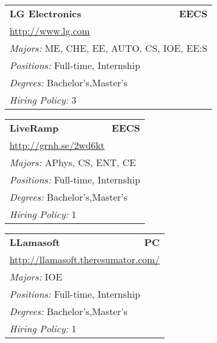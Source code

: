 \documentclass[twoside]{article}
\begin{document}
\begin{center}
\begin{multicols}{3}
\begin{FlushLeft}
\begin{minipage}{.9\columnwidth}
\end{minipage}
 
\begin{minipage}{.9\columnwidth}\begin{tabularx}{.95\columnwidth}{Xr}
                 {\Large\bf LG Electronics} & {\Large\bf EECS}\\
    \multicolumn{2}{p{.95\columnwidth}}{\url{http://www.lg.com}}\\
    \multicolumn{2}{p{.95\columnwidth}}{\emph{Majors:} ME, CHE, EE, AUTO, CS, IOE, EE:S}\\
    \multicolumn{2}{p{.95\columnwidth}}{\emph{Positions:} Full-time, Internship}\\
    \multicolumn{2}{p{.95\columnwidth}}{\emph{Degrees:} Bachelor's,Master's}\\
    \multicolumn{2}{p{.95\columnwidth}}{\emph{Hiring Policy:} 3}\\
    \end{tabularx}
    
\end{minipage}
 
\begin{minipage}{.9\columnwidth}\begin{tabularx}{.95\columnwidth}{Xr}
                 {\Large\bf LiveRamp} & {\Large\bf EECS}\\
    \multicolumn{2}{p{.95\columnwidth}}{\url{http://grnh.se/2wd6kt}}\\
    \multicolumn{2}{p{.95\columnwidth}}{\emph{Majors:} APhys, CS, ENT, CE}\\
    \multicolumn{2}{p{.95\columnwidth}}{\emph{Positions:} Full-time, Internship}\\
    \multicolumn{2}{p{.95\columnwidth}}{\emph{Degrees:} Bachelor's,Master's}\\
    \multicolumn{2}{p{.95\columnwidth}}{\emph{Hiring Policy:} 1}\\
    \end{tabularx}
    
\end{minipage}
 
\begin{minipage}{.9\columnwidth}\begin{tabularx}{.95\columnwidth}{Xr}
                 {\Large\bf LLamasoft} & {\Large\bf PC}\\
    \multicolumn{2}{p{.95\columnwidth}}{\url{http://llamasoft.theresumator.com/}}\\
    \multicolumn{2}{p{.95\columnwidth}}{\emph{Majors:} IOE}\\
    \multicolumn{2}{p{.95\columnwidth}}{\emph{Positions:} Full-time, Internship}\\
    \multicolumn{2}{p{.95\columnwidth}}{\emph{Degrees:} Bachelor's,Master's}\\
    \multicolumn{2}{p{.95\columnwidth}}{\emph{Hiring Policy:} 1}\\
    \end{tabularx}
    

\end{minipage}
\end{FlushLeft}
\end{multicols}
\end{center}
\end{document}
